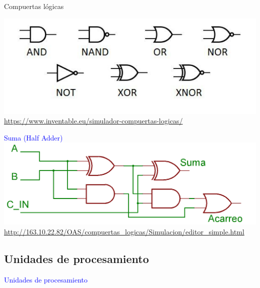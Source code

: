 \documentclass[10pt,xcolor={dvipsnames}]{beamer}
\begin{document}
\begin{frame}{Compuertas lógicas}
\begin{center}
\includegraphics[scale=0.7]{Figures/4puertas} \\ \pause
\tiny{\url{https://www.inventable.eu/simulador-compuertas-logicas/}}
\end{center}
\end{frame}

\begin{frame}
\begin{center}
\Large{\textcolor{blue}{Suma (Half Adder)}} \\ \vspace{1cm}
\includegraphics[scale=0.2]{Figures/4Suma} \\ \pause
\tiny{\url{http://163.10.22.82/OAS/compuertas_logicas/Simulacion/editor_simple.html}}
\end{center}
\end{frame}

\subsection{Unidades de procesamiento}

\begin{frame}
\begin{center}
\Huge{\textcolor{blue}{Unidades de procesamiento}}
\end{center}
\end{frame}
\end{document}
